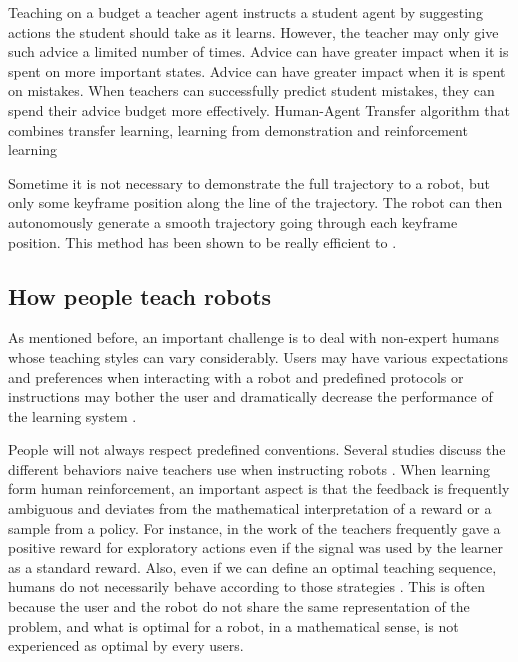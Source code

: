 \cite{torrey2013teaching} Teaching on a budget
a teacher agent instructs a student agent by suggesting actions the student should take as it learns. However, the teacher may only give such advice a limited number of times.  Advice can have greater impact when it is spent on more
important states. Advice can have greater impact when it is spent on mistakes. When teachers can successfully predict student mistakes, they
can spend their advice budget more effectively.
\cite{taylor2011integrating} Human-Agent Transfer algorithm that combines transfer learning, learning from demonstration and reinforcement learning


Sometime it is not necessary to demonstrate the full trajectory to a robot, but only some keyframe position along the line of the trajectory. The robot can then autonomously generate a smooth trajectory going through each keyframe position. This method has been shown to be really efficient to  \cite{akgun12hri}. 

\subsection{How people teach robots}


As mentioned before, an important challenge is to deal with non-expert humans whose teaching styles can vary considerably. Users may have various expectations and preferences when interacting with a robot and predefined protocols or instructions may bother the user and dramatically decrease the performance of the learning system \cite{thomaz2008teachable,rouanet2013impact}.

People will not always respect predefined conventions. Several studies discuss the different behaviors naive teachers use when instructing robots \cite{thomaz2008teachable,Cakmak2010optimality}. When learning form human reinforcement, an important aspect is that the feedback is frequently ambiguous and deviates from the mathematical interpretation of a reward or a sample from a policy. For instance, in the work of \cite{thomaz2008teachable} the teachers frequently gave a positive reward for exploratory actions even if the signal was used by the learner as a standard reward. Also, even if we can define an optimal teaching sequence, humans do not necessarily behave according to those strategies \cite{Cakmak2010optimality}. This is often because the user and the robot do not share the same representation of the problem, and what is optimal for a robot, in a mathematical sense, is not experienced as optimal by every users. 

